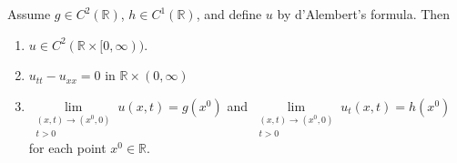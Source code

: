 \documentclass{article}
\numberwithin{equation}{section}
\begin{document}
	\begin{theorem}[Solution to the Wave Equation ($n = 1$)]
		Assume $g \in C^{2}(\mathbb{R})$, $h \in C^{1}(\mathbb{R})$, and define $u$ by d'Alembert's formula. Then \vspace{-0.25cm}
		\begin{enumerate}[itemsep =-2pt,label = (\roman{*})]
			\item $u \in C^{2}(\mathbb{R} \times [0, \infty))$. 
			\item $u_{tt} - u_{xx} = 0$ in $\mathbb{R} \times (0, \infty)$ 
			\item $\lim\limits_{\substack{(x, t) \to (x^{0}, 0) \\ t > 0}}u(x, t) = g(x^{0})$ and $\lim\limits_{\substack{(x, t) \to (x^{0}, 0) \\ t > 0}}u_{t}(x, t) = h(x^{0})$ for each point $x^{0} \in \mathbb{R}$. 
		\end{enumerate}
	\end{theorem}
	\newpage 
\end{document}
